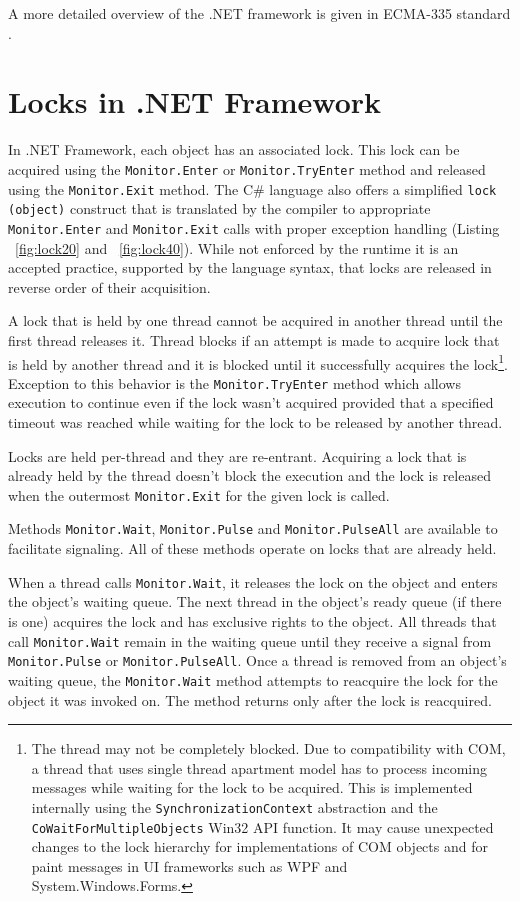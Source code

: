 A more detailed overview of the .NET framework is given in ECMA-335 standard \citep{Ecma335}.

\section{Locks in .NET Framework}

In .NET Framework, each object has an associated lock. This lock can be acquired using the \texttt{Monitor.Enter} or \texttt{Monitor.TryEnter} method and released using the \texttt{Monitor.Exit} method. The C\# language also offers a simplified \texttt{lock (object)} construct that is translated by the compiler to appropriate \texttt{Monitor.Enter} and \texttt{Monitor.Exit} calls with proper exception handling (Listing ~\ref{fig:lock20} and ~\ref{fig:lock40}). While not enforced by the runtime it is an accepted practice, supported by the language syntax, that locks are released in reverse order of their acquisition.

A lock that is held by one thread cannot be acquired in another thread until the first thread releases it. Thread blocks if an attempt is made to acquire lock that is held by another thread and it is blocked until it successfully acquires the lock\footnote{The thread may not be completely blocked. Due to compatibility with COM, a thread that uses single thread apartment model has to process incoming messages while waiting for the lock to be acquired. This is implemented internally using the \texttt{SynchronizationContext} abstraction and the \texttt{CoWaitForMultipleObjects} Win32 API function. It may cause unexpected changes to the lock hierarchy for implementations of COM objects and for paint messages in UI frameworks such as WPF and System.Windows.Forms.}. Exception to this behavior is the \texttt{Monitor.TryEnter} method which allows execution to continue even if the lock wasn't acquired provided that a specified timeout was reached while waiting for the lock to be released by another thread.

Locks are held per-thread and they are re-entrant. Acquiring a lock that is already held by the thread doesn't block the execution and the lock is released when the outermost \texttt{Monitor.Exit} for the given lock is called.

Methods \texttt{Monitor.Wait}, \texttt{Monitor.Pulse} and \texttt{Monitor.PulseAll} are available to facilitate signaling. All of these methods operate on locks that are already held.

When a thread calls \texttt{Monitor.Wait}, it releases the lock on the object and enters the object's waiting queue. The next thread in the object's ready queue (if there is one) acquires the lock and has exclusive rights to the object. All threads that call \texttt{Monitor.Wait} remain in the waiting queue until they receive a signal from \texttt{Monitor.Pulse} or \texttt{Monitor.PulseAll}. Once a thread is removed from an object's waiting queue, the \texttt{Monitor.Wait} method attempts to reacquire the lock for the object it was invoked on. The method returns only after the lock is reacquired.

